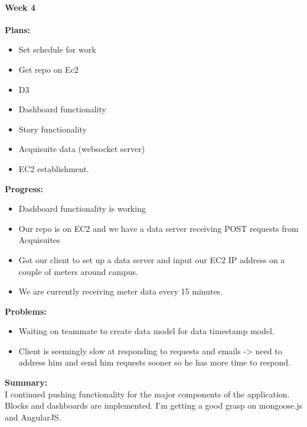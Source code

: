 \paragraph{Week 4}
\begin{adjustwidth}{2.5em}{0pt}
    \vspace{-0.5cm}\textbf{Plans:}
    \vspace{-0.5cm}
    \begin{itemize}
        \item Set schedule for work
        \item Get repo on Ec2
        \item D3
        \item Dashboard functionality
        \item Story functionality
        \item Acquisuite data (websocket server)
        \item EC2 establishment.
    \end{itemize} 
    \vspace{-0.3cm}\textbf{Progress:}
    \vspace{-0.5cm}
    \begin{itemize}
        \item Dashboard functionality is working
        \item Our repo is on EC2 and we have a data server receiving POST requests from Acquisuites
        \item Got our client to set up a data server and input our EC2 IP address on a couple of meters around campus. 
        \item We are currently receiving meter data every 15 minutes. 
    \end{itemize} 
    \vspace{-0.3cm}\textbf{Problems:}
    \vspace{-0.5cm}
    \begin{itemize}
        \item Waiting on teammate to create data model for data timestamp model. 
        \item Client is seemingly slow at responding to requests and emails -> need to address him and send him requests sooner so he has more time to respond.
    \end{itemize}  
    \vspace{-0.3cm}\noindent\textbf{Summary:}\\
    \noindent I continued pushing functionality for the major components of the application. Blocks and dashboards are implemented. I'm getting a good grasp on mongoose.js and AngularJS.
\end{adjustwidth} 
